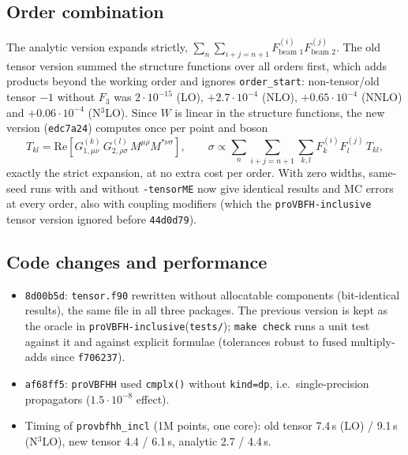 \documentclass[11pt,a4paper]{article}
\newcommand{\provbfhh}{\texttt{proVBFHH}\xspace}
\newcommand{\provbfhinc}{\texttt{proVBFH-inclusive}\xspace}
\newcommand{\commit}[1]{\texttt{#1}}
\newcommand{\file}[1]{\texttt{#1}}
\begin{document}
\subsection{Order combination}

The analytic version expands strictly, $\sum_{n}\sum_{i+j=n+1}
F^{(i)}_{\text{beam 1}}F^{(j)}_{\text{beam 2}}$. The old tensor version
summed the structure functions over all orders first, which adds
products beyond the working order and ignores \texttt{order\_start}:
non-tensor/old tensor $-1$ without $F_3$ was $2\cdot10^{-15}$ (LO),
$+2.7\cdot10^{-4}$ (NLO), $+0.65\cdot10^{-4}$ (NNLO) and
$+0.06\cdot10^{-4}$ (N$^3$LO). Since $W$ is linear in the structure
functions, the new version (\commit{edc7a24}) computes once per point
and boson
\begin{equation}
  T_{kl} = \mathrm{Re}\left[G^{(k)}_{1,\mu\nu}\,G^{(l)}_{2,\rho\sigma}\,
  M^{\mu\rho}M^{*\nu\sigma}\right],\qquad
  \sigma \propto \sum_{n}\sum_{i+j=n+1}\sum_{k,l}
  F_k^{(i)}F_l^{(j)}\,T_{kl},
\end{equation}
exactly the strict expansion, at no extra cost per order. With zero
widths, same-seed runs with and without \texttt{-tensorME} now give
identical results and MC errors at every order, also with coupling
modifiers (which the \provbfhinc tensor version ignored before
\commit{44d0d79}).

\subsection{Code changes and performance}

\begin{itemize}
\item \commit{8d00b5d}: \file{tensor.f90} rewritten without allocatable
  components (bit-identical results), the same file in all three
  packages. The previous version is kept as the oracle in
  \provbfhinc (\file{tests/}); \texttt{make check}
  runs a unit test against it and against explicit formulae
  (tolerances robust to fused multiply-adds since \commit{f706237}).
\item \commit{af68ff5}: \provbfhh used \texttt{cmplx()} without
  \texttt{kind=dp}, i.e.\ single-precision propagators
  ($1.5\cdot10^{-8}$ effect).
\item Timing of \texttt{provbfhh\_incl} (1M points, one core): old
  tensor 7.4\,s (LO) / 9.1\,s (N$^3$LO), new tensor 4.4 / 6.1\,s,
  analytic 2.7 / 4.4\,s.
\end{itemize}
\end{document}
